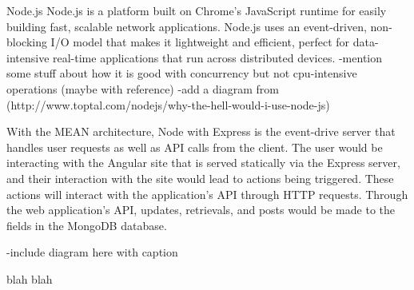 \documentclass[12pt]{article}
\begin{document}
Node.js %
Node.js is a platform built on Chrome's JavaScript runtime for easily building fast, scalable network applications. Node.js uses an event-driven, non-blocking I/O model that makes it lightweight and efficient, perfect for data-intensive real-time applications that run across distributed devices.
-mention some stuff about how it is good with concurrency but not cpu-intensive operations (maybe with reference)
-add a diagram from (http://www.toptal.com/nodejs/why-the-hell-would-i-use-node-js)

With the MEAN architecture, Node with Express is the event-drive server that handles user requests as well as API calls from the client. The user would be interacting with the Angular site that is served statically via the Express server, and their interaction with the site would lead to actions being triggered. These actions will interact with the application's API through HTTP requests. Through the web application's API, updates, retrievals, and posts would be made to the fields in the MongoDB database.

-include diagram here with caption

\newpage

blah blah

\newpage
\end{document}
